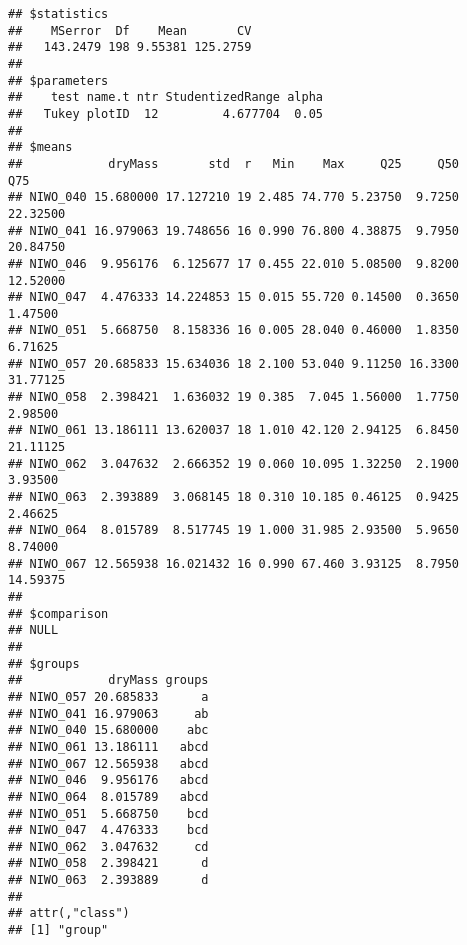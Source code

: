 \documentclass[
]{article}
\begin{document}
\begin{verbatim}
## $statistics
##    MSerror  Df    Mean       CV
##   143.2479 198 9.55381 125.2759
## 
## $parameters
##    test name.t ntr StudentizedRange alpha
##   Tukey plotID  12         4.677704  0.05
## 
## $means
##            dryMass       std  r   Min    Max     Q25     Q50      Q75
## NIWO_040 15.680000 17.127210 19 2.485 74.770 5.23750  9.7250 22.32500
## NIWO_041 16.979063 19.748656 16 0.990 76.800 4.38875  9.7950 20.84750
## NIWO_046  9.956176  6.125677 17 0.455 22.010 5.08500  9.8200 12.52000
## NIWO_047  4.476333 14.224853 15 0.015 55.720 0.14500  0.3650  1.47500
## NIWO_051  5.668750  8.158336 16 0.005 28.040 0.46000  1.8350  6.71625
## NIWO_057 20.685833 15.634036 18 2.100 53.040 9.11250 16.3300 31.77125
## NIWO_058  2.398421  1.636032 19 0.385  7.045 1.56000  1.7750  2.98500
## NIWO_061 13.186111 13.620037 18 1.010 42.120 2.94125  6.8450 21.11125
## NIWO_062  3.047632  2.666352 19 0.060 10.095 1.32250  2.1900  3.93500
## NIWO_063  2.393889  3.068145 18 0.310 10.185 0.46125  0.9425  2.46625
## NIWO_064  8.015789  8.517745 19 1.000 31.985 2.93500  5.9650  8.74000
## NIWO_067 12.565938 16.021432 16 0.990 67.460 3.93125  8.7950 14.59375
## 
## $comparison
## NULL
## 
## $groups
##            dryMass groups
## NIWO_057 20.685833      a
## NIWO_041 16.979063     ab
## NIWO_040 15.680000    abc
## NIWO_061 13.186111   abcd
## NIWO_067 12.565938   abcd
## NIWO_046  9.956176   abcd
## NIWO_064  8.015789   abcd
## NIWO_051  5.668750    bcd
## NIWO_047  4.476333    bcd
## NIWO_062  3.047632     cd
## NIWO_058  2.398421      d
## NIWO_063  2.393889      d
## 
## attr(,"class")
## [1] "group"
\end{verbatim}
\end{document}
